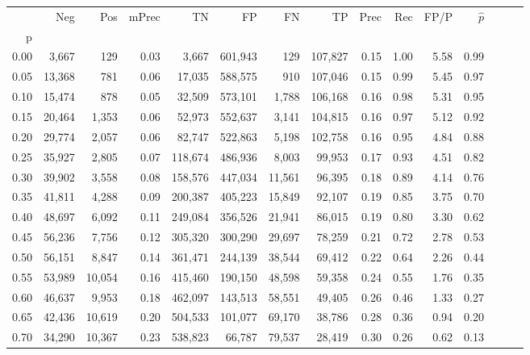 \begin{tabular}{rrrrrrrrrrrrrrr}
\toprule
{} &     Neg &     Pos & mPrec &       TN &       FP &       FN &       TP &  Prec &   Rec &  FP/P & $\hat{p}$ \\
p    &         &         &       &          &          &          &          &       &       &       &           \\
\midrule
0.00 &   3,667 &     129 &  0.03 &    3,667 &  601,943 &      129 &  107,827 &  0.15 &  1.00 &  5.58 &      0.99 \\
0.05 &  13,368 &     781 &  0.06 &   17,035 &  588,575 &      910 &  107,046 &  0.15 &  0.99 &  5.45 &      0.97 \\
0.10 &  15,474 &     878 &  0.05 &   32,509 &  573,101 &    1,788 &  106,168 &  0.16 &  0.98 &  5.31 &      0.95 \\
0.15 &  20,464 &   1,353 &  0.06 &   52,973 &  552,637 &    3,141 &  104,815 &  0.16 &  0.97 &  5.12 &      0.92 \\
0.20 &  29,774 &   2,057 &  0.06 &   82,747 &  522,863 &    5,198 &  102,758 &  0.16 &  0.95 &  4.84 &      0.88 \\
0.25 &  35,927 &   2,805 &  0.07 &  118,674 &  486,936 &    8,003 &   99,953 &  0.17 &  0.93 &  4.51 &      0.82 \\
0.30 &  39,902 &   3,558 &  0.08 &  158,576 &  447,034 &   11,561 &   96,395 &  0.18 &  0.89 &  4.14 &      0.76 \\
0.35 &  41,811 &   4,288 &  0.09 &  200,387 &  405,223 &   15,849 &   92,107 &  0.19 &  0.85 &  3.75 &      0.70 \\
0.40 &  48,697 &   6,092 &  0.11 &  249,084 &  356,526 &   21,941 &   86,015 &  0.19 &  0.80 &  3.30 &      0.62 \\
0.45 &  56,236 &   7,756 &  0.12 &  305,320 &  300,290 &   29,697 &   78,259 &  0.21 &  0.72 &  2.78 &      0.53 \\
0.50 &  56,151 &   8,847 &  0.14 &  361,471 &  244,139 &   38,544 &   69,412 &  0.22 &  0.64 &  2.26 &      0.44 \\
0.55 &  53,989 &  10,054 &  0.16 &  415,460 &  190,150 &   48,598 &   59,358 &  0.24 &  0.55 &  1.76 &      0.35 \\
0.60 &  46,637 &   9,953 &  0.18 &  462,097 &  143,513 &   58,551 &   49,405 &  0.26 &  0.46 &  1.33 &      0.27 \\
0.65 &  42,436 &  10,619 &  0.20 &  504,533 &  101,077 &   69,170 &   38,786 &  0.28 &  0.36 &  0.94 &      0.20 \\
0.70 &  34,290 &  10,367 &  0.23 &  538,823 &   66,787 &   79,537 &   28,419 &  0.30 &  0.26 &  0.62 &      0.13 \\

\end{tabular}
